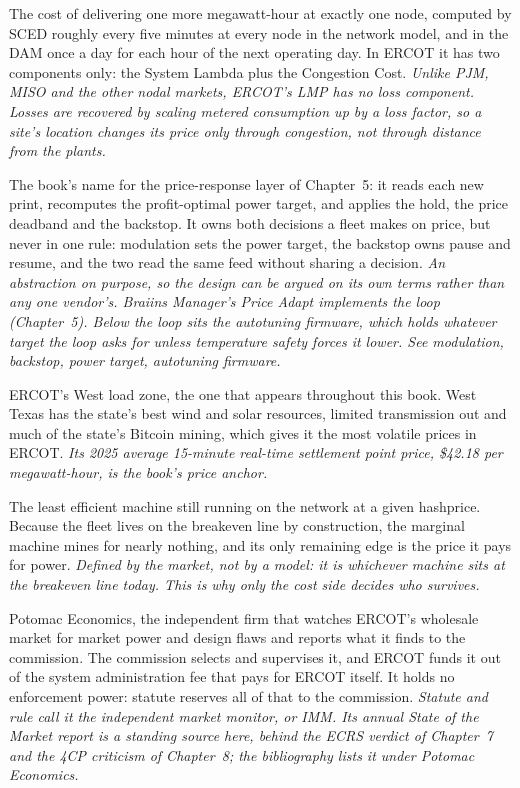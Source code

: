 \begin{description}[leftmargin=0pt,style=unboxed,itemsep=0.35em,parsep=0.15em]
\item[Locational Marginal Price (LMP)] \hypertarget{glossary:locational-marginal-price}{}The cost of delivering one more megawatt-hour at exactly one node, computed by SCED roughly every five minutes at every node in the network model, and in the DAM once a day for each hour of the next operating day. In ERCOT it has two components only: the System Lambda plus the Congestion Cost. \emph{Unlike PJM, MISO and the other nodal markets, ERCOT's LMP has no loss component. Losses are recovered by scaling metered consumption up by a loss factor, so a site's location changes its price only through congestion, not through distance from the plants.}
\item[the loop] \hypertarget{glossary:the-loop}{}The book's name for the price-response layer of Chapter~5: it reads each new print, recomputes the profit-optimal power target, and applies the hold, the price deadband and the backstop. It owns both decisions a fleet makes on price, but never in one rule: modulation sets the power target, the backstop owns pause and resume, and the two read the same feed without sharing a decision. \emph{An abstraction on purpose, so the design can be argued on its own terms rather than any one vendor's. Braiins Manager's Price Adapt implements the loop (Chapter~5). Below the loop sits the autotuning firmware, which holds whatever target the loop asks for unless temperature safety forces it lower. See modulation, backstop, power target, autotuning firmware.}
\item[LZ\_WEST] \hypertarget{glossary:lz-west}{}ERCOT's West load zone, the one that appears throughout this book. West Texas has the state's best wind and solar resources, limited transmission out and much of the state's Bitcoin mining, which gives it the most volatile prices in ERCOT. \emph{Its 2025 average 15-minute real-time settlement point price, \$42.18 per megawatt-hour, is the book's price anchor.}
\item[marginal machine] \hypertarget{glossary:marginal-machine}{}The least efficient machine still running on the network at a given hashprice. Because the fleet lives on the breakeven line by construction, the marginal machine mines for nearly nothing, and its only remaining edge is the price it pays for power. \emph{Defined by the market, not by a model: it is whichever machine sits at the breakeven line today. This is why only the cost side decides who survives.}
\item[market monitor] \hypertarget{glossary:market-monitor}{}Potomac Economics, the independent firm that watches ERCOT's wholesale market for market power and design flaws and reports what it finds to the commission. The commission selects and supervises it, and ERCOT funds it out of the system administration fee that pays for ERCOT itself. It holds no enforcement power: statute reserves all of that to the commission. \emph{Statute and rule call it the independent market monitor, or IMM. Its annual State of the Market report is a standing source here, behind the ECRS verdict of Chapter~7 and the 4CP criticism of Chapter~8; the bibliography lists it under Potomac Economics.}

\end{description}
